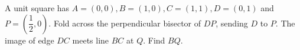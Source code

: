 A unit square has $A=(0,0),B=(1,0),C=(1,1),D=(0,1)$ and $P=(\dfrac{1}{2},0)$. Fold across the perpendicular bisector of $DP$, sending $D$ to $P$. The image of edge $DC$ meets line $BC$ at $Q$. Find $BQ$.
